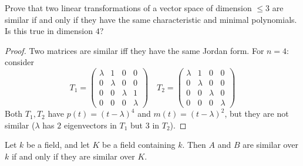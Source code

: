 \documentclass[openany]{book}
\begin{document}
\begin{prob}[7.3]
    Prove that two linear transformations of a vector space of dimension \(\leq 3\) are similar if and only if they have the same characteristic and minimal polynomials. Is this true in dimension \(4\)?
\end{prob}
\begin{proof}
    Two matrices are similar iff they have the same Jordan form. For $n=4$: consider 
    \[
    T_1=\begin{pmatrix}
\lambda & 1 & 0 & 0 \\
0 & \lambda & 0 & 0 \\
0 & 0 & \lambda & 1 \\
0 & 0 & 0 & \lambda
\end{pmatrix} \quad 
T_2=\begin{pmatrix}
\lambda & 1 & 0 & 0 \\
0 & \lambda & 0 & 0 \\
0 & 0 & \lambda & 0 \\
0 & 0 & 0 & \lambda
\end{pmatrix}
\]
Both $T_1,T_2$ have $p(t)=(t-\lambda)^4$ and $m(t)=(t-\lambda)^2$, but they are not similar ($\lambda$ has $2$ eigenvectors in $T_1$ but $3$ in $T_2$).
\end{proof}

\begin{prop}[7.4]
    Let \(k\) be a field, and let \(K\) be a field containing \(k\). Then \(A\) and \(B\) are similar over \(k\) if and only if they are similar over \(K\).
\end{prop}
\end{document}
